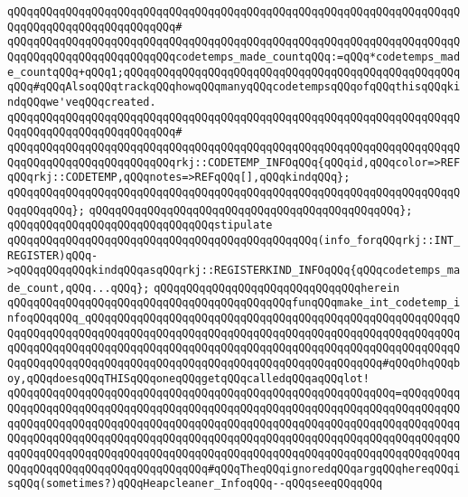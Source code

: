 \verb|qQQqqQQqqQQqqQQqqQQqqQQqqQQqqQQqqQQqqQQqqQQqqQQqqQQqqQQqqQQqqQQqqQQqqQQqqQQqqQQqqQQqqQQqqQQqqQQq#|\newline
\verb|qQQqqQQqqQQqqQQqqQQqqQQqqQQqqQQqqQQqqQQqqQQqqQQqqQQqqQQqqQQqqQQqqQQqqQQqqQQqqQQqqQQqqQQqqQQqqQQqcodetemps_made_countqQQq:=qQQq*codetemps_made_countqQQq+qQQq1;qQQqqQQqqQQqqQQqqQQqqQQqqQQqqQQqqQQqqQQqqQQqqQQqqQQqqQQq#qQQqAlsoqQQqtrackqQQqhowqQQqmanyqQQqcodetempsqQQqofqQQqthisqQQqkindqQQqwe'veqQQqcreated.|\newline
\verb|qQQqqQQqqQQqqQQqqQQqqQQqqQQqqQQqqQQqqQQqqQQqqQQqqQQqqQQqqQQqqQQqqQQqqQQqqQQqqQQqqQQqqQQqqQQqqQQq#|\newline
\verb|qQQqqQQqqQQqqQQqqQQqqQQqqQQqqQQqqQQqqQQqqQQqqQQqqQQqqQQqqQQqqQQqqQQqqQQqqQQqqQQqqQQqqQQqqQQqqQQqrkj::CODETEMP_INFOqQQq{qQQqid,qQQqcolor=>REFqQQqrkj::CODETEMP,qQQqnotes=>REFqQQq[],qQQqkindqQQq};|\newline
\verb|qQQqqQQqqQQqqQQqqQQqqQQqqQQqqQQqqQQqqQQqqQQqqQQqqQQqqQQqqQQqqQQqqQQqqQQqqQQqqQQq};|\newline
\verb|qQQqqQQqqQQqqQQqqQQqqQQqqQQqqQQqqQQqqQQqqQQqqQQq};|\newline
\newline
\verb|qQQqqQQqqQQqqQQqqQQqqQQqqQQqqQQqstipulate|\newline
\verb|qQQqqQQqqQQqqQQqqQQqqQQqqQQqqQQqqQQqqQQqqQQqqQQq(info_forqQQqrkj::INT_REGISTER)qQQq->qQQqqQQqqQQqkindqQQqasqQQqrkj::REGISTERKIND_INFOqQQq{qQQqcodetemps_made_count,qQQq...qQQq};|\newline
\verb|qQQqqQQqqQQqqQQqqQQqqQQqqQQqqQQqherein|\newline
\verb|qQQqqQQqqQQqqQQqqQQqqQQqqQQqqQQqqQQqqQQqqQQqfunqQQqmake_int_codetemp_infoqQQqqQQq_qQQqqQQqqQQqqQQqqQQqqQQqqQQqqQQqqQQqqQQqqQQqqQQqqQQqqQQqqQQqqQQqqQQqqQQqqQQqqQQqqQQqqQQqqQQqqQQqqQQqqQQqqQQqqQQqqQQqqQQqqQQqqQQqqQQqqQQqqQQqqQQqqQQqqQQqqQQqqQQqqQQqqQQqqQQqqQQqqQQqqQQqqQQqqQQqqQQqqQQqqQQqqQQqqQQqqQQqqQQqqQQqqQQqqQQqqQQqqQQqqQQqqQQqqQQqqQQq#qQQqOhqQQqboy,qQQqdoesqQQqTHISqQQqoneqQQqgetqQQqcalledqQQqaqQQqlot!|\newline
\verb|qQQqqQQqqQQqqQQqqQQqqQQqqQQqqQQqqQQqqQQqqQQqqQQqqQQqqQQqqQQq=qQQqqQQqqQQqqQQqqQQqqQQqqQQqqQQqqQQqqQQqqQQqqQQqqQQqqQQqqQQqqQQqqQQqqQQqqQQqqQQqqQQqqQQqqQQqqQQqqQQqqQQqqQQqqQQqqQQqqQQqqQQqqQQqqQQqqQQqqQQqqQQqqQQqqQQqqQQqqQQqqQQqqQQqqQQqqQQqqQQqqQQqqQQqqQQqqQQqqQQqqQQqqQQqqQQqqQQqqQQqqQQqqQQqqQQqqQQqqQQqqQQqqQQqqQQqqQQqqQQqqQQqqQQqqQQqqQQqqQQqqQQqqQQqqQQqqQQqqQQqqQQqqQQqqQQqqQQqqQQq#qQQqTheqQQqignoredqQQqargqQQqhereqQQqisqQQq(sometimes?)qQQqHeapcleaner_InfoqQQq--qQQqseeqQQqqQQq|\newline
